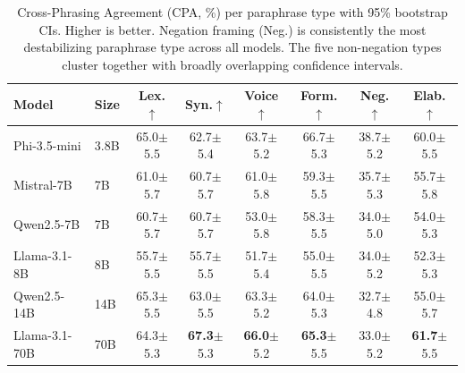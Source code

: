 \documentclass{article}
\begin{document}
\begin{table}[t]
\caption{Cross-Phrasing Agreement (CPA, \%) per paraphrase type with 95\% bootstrap CIs. Higher is better. Negation framing (Neg.) is consistently the most destabilizing paraphrase type across all models. The five non-negation types cluster together with broadly overlapping confidence intervals.}
\label{tab:phrasing}
\centering
\small
\begin{tabular}{llcccccc}
\toprule
Model & Size & Lex.$\uparrow$ & Syn.$\uparrow$ & Voice$\uparrow$ & Form.$\uparrow$ & Neg.$\uparrow$ & Elab.$\uparrow$ \\
\midrule
Phi-3.5-mini & 3.8B & 65.0{\scriptsize$\pm$5.5} & 62.7{\scriptsize$\pm$5.4} & 63.7{\scriptsize$\pm$5.2} & 66.7{\scriptsize$\pm$5.3} & 38.7{\scriptsize$\pm$5.2} & 60.0{\scriptsize$\pm$5.5} \\
Mistral-7B & 7B & 61.0{\scriptsize$\pm$5.7} & 60.7{\scriptsize$\pm$5.7} & 61.0{\scriptsize$\pm$5.8} & 59.3{\scriptsize$\pm$5.5} & 35.7{\scriptsize$\pm$5.3} & 55.7{\scriptsize$\pm$5.8} \\
Qwen2.5-7B & 7B & 60.7{\scriptsize$\pm$5.7} & 60.7{\scriptsize$\pm$5.7} & 53.0{\scriptsize$\pm$5.8} & 58.3{\scriptsize$\pm$5.5} & 34.0{\scriptsize$\pm$5.0} & 54.0{\scriptsize$\pm$5.3} \\
Llama-3.1-8B & 8B & 55.7{\scriptsize$\pm$5.5} & 55.7{\scriptsize$\pm$5.5} & 51.7{\scriptsize$\pm$5.4} & 55.0{\scriptsize$\pm$5.5} & 34.0{\scriptsize$\pm$5.2} & 52.3{\scriptsize$\pm$5.3} \\
Qwen2.5-14B & 14B & 65.3{\scriptsize$\pm$5.5} & 63.0{\scriptsize$\pm$5.5} & 63.3{\scriptsize$\pm$5.2} & 64.0{\scriptsize$\pm$5.3} & 32.7{\scriptsize$\pm$4.8} & 55.0{\scriptsize$\pm$5.7} \\
Llama-3.1-70B & 70B & 64.3{\scriptsize$\pm$5.3} & \textbf{67.3}{\scriptsize$\pm$5.3} & \textbf{66.0}{\scriptsize$\pm$5.2} & \textbf{65.3}{\scriptsize$\pm$5.5} & 33.0{\scriptsize$\pm$5.2} & \textbf{61.7}{\scriptsize$\pm$5.5} \\
\bottomrule
\end{tabular}
\end{table}
\end{document}
